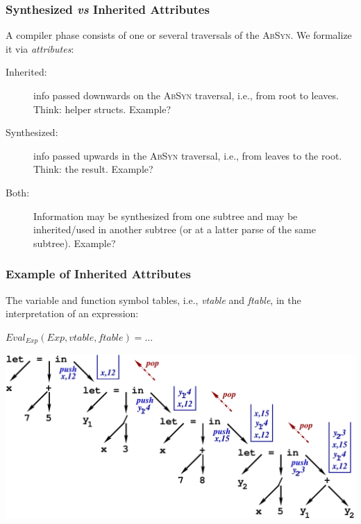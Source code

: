 \documentclass{beamer}
\newcommand{\emp}[1]{\textcolor{DikuRed}{ #1}}
\begin{document}
\begin{frame}[fragile,t]
   \frametitle{Synthesized {\em vs} Inherited Attributes}

\bigskip

A compiler phase consists of one or several traversals of the \textsc{AbSyn}.
We formalize it via {\em attributes}:

\bigskip

\begin{description}

    \item[Inherited:] info passed downwards on the \textsc{AbSyn} traversal, i.e.,
                        from root to leaves. Think: helper structs. \alert{Example?}\bigskip

    \item[Synthesized:] info passed upwards in the \textsc{AbSyn} traversal, i.e., from
                        leaves to the root. Think: the result. \alert{Example?}\bigskip

    \item[Both:]    Information may be synthesized from one subtree and
                    may be inherited/used in another subtree (or at a latter
                    parse of the same subtree). \alert{Example?}

\end{description}

\end{frame}


\begin{frame}[fragile,t]
   \frametitle{Example of Inherited Attributes}

The variable and function symbol tables, i.e., \emp{{\em vtable}} and \emp{{\em ftable}}, 
in the interpretation of an expression: 

\bigskip

$Eval_{Exp} (Exp, vtable, ftable ) = ...$

\bigskip

\includegraphics[width=65ex]{Figures/ExpIntStack}

\end{frame}
\end{document}

